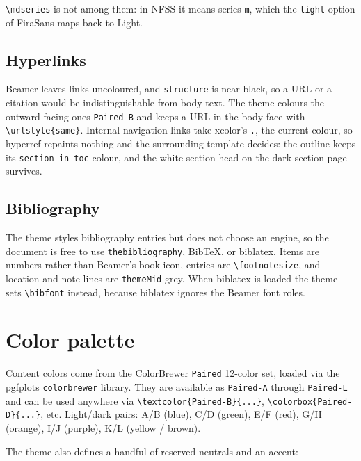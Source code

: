 \documentclass[a4paper,11pt]{article}
\begin{document}
\verb|\mdseries| is not among them: in NFSS it means series \texttt{m}, which
the \texttt{light} option of \textsf{FiraSans} maps back to Light.

\subsection{Hyperlinks}

Beamer leaves links uncoloured, and \texttt{structure} is near-black, so a URL
or a citation would be indistinguishable from body text.  The theme colours the
outward-facing ones \texttt{Paired-B} and keeps a URL in the body face with
\verb|\urlstyle{same}|.  Internal navigation links take xcolor's \texttt{.},
the current colour, so \textsf{hyperref} repaints nothing and the surrounding
template decides: the outline keeps its \texttt{section in toc} colour, and the
white section head on the dark section page survives.

\subsection{Bibliography}

The theme styles bibliography entries but does not choose an engine, so the
document is free to use \texttt{thebibliography}, BibTeX, or
\textsf{biblatex}.  Items are numbers rather than Beamer's book icon, entries
are \verb|\footnotesize|, and location and note lines are \texttt{themeMid}
grey.  When \textsf{biblatex} is loaded the theme sets \verb|\bibfont| instead,
because \textsf{biblatex} ignores the Beamer font roles.

\section{Color palette}

Content colors come from the ColorBrewer \texttt{Paired} 12-color set, loaded
via the \textsf{pgfplots} \texttt{colorbrewer} library.  They are available as
\texttt{Paired-A} through \texttt{Paired-L} and can be used anywhere via
\verb|\textcolor{Paired-B}{...}|, \verb|\colorbox{Paired-D}{...}|, etc.
Light/dark pairs: A/B (blue), C/D (green), E/F (red), G/H (orange),
I/J (purple), K/L (yellow / brown).

The theme also defines a handful of reserved neutrals and an accent:
\end{document}
